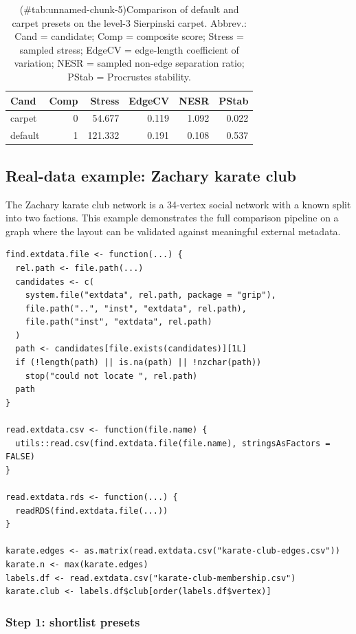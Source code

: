 \begin{table}

\caption{(\#tab:unnamed-chunk-5)Comparison of default and carpet presets on the level-3 Sierpinski carpet. Abbrev.: Cand = candidate; Comp = composite score; Stress = sampled stress; EdgeCV = edge-length coefficient of variation; NESR = sampled non-edge separation ratio; PStab = Procrustes stability.}
\centering
\begin{tabular}[t]{l|r|r|r|r|r}
\hline
Cand & Comp & Stress & EdgeCV & NESR & PStab\\
\hline
carpet & 0 & 54.677 & 0.119 & 1.092 & 0.022\\
\hline
default & 1 & 121.332 & 0.191 & 0.108 & 0.537\\
\hline
\end{tabular}
\end{table}

\subsection{Real-data example: Zachary karate club}\label{sec:karate}

The Zachary karate club network \citep{zachary1977} is a 34-vertex social network
with a known split into two factions. This example demonstrates the full
comparison pipeline on a graph where the layout can be validated against
meaningful external metadata.

\begin{verbatim}
find.extdata.file <- function(...) {
  rel.path <- file.path(...)
  candidates <- c(
    system.file("extdata", rel.path, package = "grip"),
    file.path("..", "inst", "extdata", rel.path),
    file.path("inst", "extdata", rel.path)
  )
  path <- candidates[file.exists(candidates)][1L]
  if (!length(path) || is.na(path) || !nzchar(path))
    stop("could not locate ", rel.path)
  path
}

read.extdata.csv <- function(file.name) {
  utils::read.csv(find.extdata.file(file.name), stringsAsFactors = FALSE)
}

read.extdata.rds <- function(...) {
  readRDS(find.extdata.file(...))
}

karate.edges <- as.matrix(read.extdata.csv("karate-club-edges.csv"))
karate.n <- max(karate.edges)
labels.df <- read.extdata.csv("karate-club-membership.csv")
karate.club <- labels.df$club[order(labels.df$vertex)]
\end{verbatim}

\subsubsection{Step 1: shortlist presets}\label{step-1-shortlist-presets}

